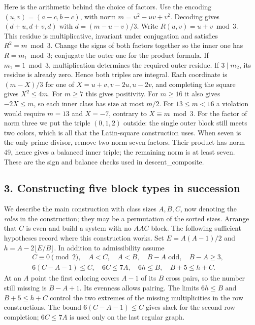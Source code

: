 \documentclass[english,11pt,a4paper]{article}
\begin{document}
Here is the arithmetic behind the choice of factors. Use the encoding \((u,v)=(a-c,b-c)\), with norm \(m=u^2-uv+v^2\). Decoding gives \((d+u,d+v,d)\) with \(d=(m-u-v)/3\). Write \(R(u,v)=u+v\bmod 3\). This residue is multiplicative, invariant under conjugation and satisfies \(R^2=m\bmod3\). Change the signs of both factors together so the inner one has \(R=m_1\bmod3\); conjugate the outer one for the product formula. If \(m_1=1\bmod3\), multiplication determines the required outer residue. If \(3\mid m_2\), its residue is already zero. Hence both triples are integral. Each coordinate is \((m-X)/3\) for one of \(X=u+v,v-2u,u-2v\), and completing the square gives \(X^2\le4m\). For \(m\ge7\) this gives positivity. For \(m\ge16\) it also gives \(-2X\le m\), so each inner class has size at most \(m/2\). For \(13\le m<16\) a violation would require \(m=13\) and \(X=-7\), contrary to \(X\equiv m\bmod3\). For the factor of norm three we put the triple \((0,1,2)\) outside: the single outer block still meets two colors, which is all that the Latin-square construction uses. When seven is the only prime divisor, remove two norm-seven factors. Their product has norm 49, hence gives a balanced inner triple; the remaining norm is at least seven. These are the sign and balance checks used in descent\_composite.

\subsection{3. Constructing five block types in succession}\label{constructing-five-block-types-in-succession}

We describe the main construction with class sizes \(A,B,C\), now denoting the \emph{roles} in the construction; they may be a permutation of the sorted sizes. Arrange that \(C\) is even and build a system with no \(AAC\) block. The following sufficient hypotheses record where this construction works. Set \(E=A(A-1)/2\) and \(h=A-2\lfloor E/B\rfloor\). In addition to admissibility assume \[\begin{gathered}
 C\equiv0\pmod2,\quad A<C,\quad A<B,\quad B-A\text{ odd},\quad B-A\ge3,\\
 6(C-A-1)\le C,\quad 6C\le7A,\quad 6h\le B,\quad B+5\le h+C .
\end{gathered}\] At an \(A\) point the first coloring covers \(A-1\) of its \(B\) cross pairs, so the number still missing is \(B-A+1\). Its evenness allows pairing. The limits \(6h\le B\) and \(B+5\le h+C\) control the two extremes of the missing multiplicities in the row constructions. The bound \(6(C-A-1)\le C\) gives slack for the second row completion; \(6C\le7A\) is used only on the last regular graph.
\end{document}
